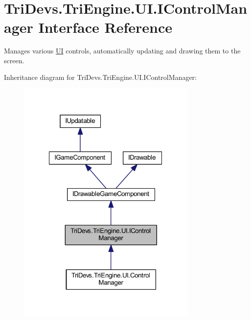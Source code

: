 \hypertarget{interface_tri_devs_1_1_tri_engine_1_1_u_i_1_1_i_control_manager}{\section{Tri\-Devs.\-Tri\-Engine.\-U\-I.\-I\-Control\-Manager Interface Reference}
\label{interface_tri_devs_1_1_tri_engine_1_1_u_i_1_1_i_control_manager}
}


Manages various \hyperlink{namespace_tri_devs_1_1_tri_engine_1_1_u_i}{U\-I} controls, automatically updating and drawing them to the screen.  




Inheritance diagram for Tri\-Devs.\-Tri\-Engine.\-U\-I.\-I\-Control\-Manager\-:
\nopagebreak
\begin{figure}[H]
\begin{center}
\leavevmode
\includegraphics[width=251pt]{interface_tri_devs_1_1_tri_engine_1_1_u_i_1_1_i_control_manager__inherit__graph}
\end{center}
\end{figure}


